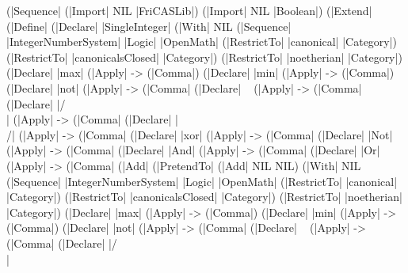 \documentclass{article}
\begin{document}
\begin{code}
(|Sequence| (|Import| NIL |FriCASLib|) (|Import| NIL |Boolean|)
    (|Extend|
        (|Define|
            (|Declare| |SingleInteger|
                (|With| NIL
                        (|Sequence| |IntegerNumberSystem| |Logic|
                            |OpenMath|
                            (|RestrictTo| |canonical| |Category|)
                            (|RestrictTo| |canonicalsClosed|
                                |Category|)
                            (|RestrictTo| |noetherian| |Category|)
                            (|Declare| |max| (|Apply| -> (|Comma|) %
                            (|Declare| |min| (|Apply| -> (|Comma|) %
                            (|Declare| |not|
                                (|Apply| -> (|Comma| %
                            (|Declare| ~ (|Apply| -> (|Comma| %
                            (|Declare| |/\\|
                                (|Apply| -> (|Comma| %
                            (|Declare| |\\/|
                                (|Apply| -> (|Comma| %
                            (|Declare| |xor|
                                (|Apply| -> (|Comma| %
                            (|Declare| |Not|
                                (|Apply| -> (|Comma| %
                            (|Declare| |And|
                                (|Apply| -> (|Comma| %
                            (|Declare| |Or|
                                (|Apply| -> (|Comma| %
            (|Add| (|PretendTo| (|Add| NIL NIL)
                       (|With| NIL
                               (|Sequence| |IntegerNumberSystem|
                                   |Logic| |OpenMath|
                                   (|RestrictTo| |canonical|
                                    |Category|)
                                   (|RestrictTo| |canonicalsClosed|
                                    |Category|)
                                   (|RestrictTo| |noetherian|
                                    |Category|)
                                   (|Declare| |max|
                                    (|Apply| -> (|Comma|) %
                                   (|Declare| |min|
                                    (|Apply| -> (|Comma|) %
                                   (|Declare| |not|
                                    (|Apply| -> (|Comma| %
                                   (|Declare| ~
                                    (|Apply| -> (|Comma| %
                                   (|Declare| |/\\|

\end{code}
\end{document}
